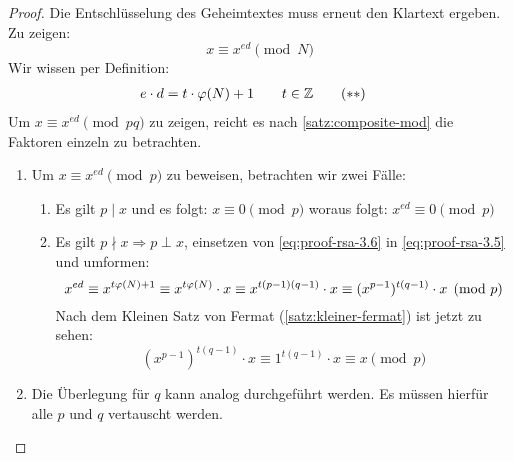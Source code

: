 \begin{proof}
  Die Entschlüsselung des Geheimtextes muss erneut den Klartext ergeben. Zu zeigen:
  \begin{equation}
    \label{eq:proof-rsa-3.5}
    x \equiv x^{ed} \pmod{N} \tag{$*$}
  \end{equation}
  Wir wissen per Definition:
  \begin{align}
    \label{eq:proof-rsa-3.6}
    e \cdot d & = t \cdot \varphi(N) + 1 \qquad t \in \mathbb{Z} \tag{$**$}
  \end{align}
  Um $x \equiv x^{ed} \pmod{pq}$ zu zeigen, reicht es nach \eqref{satz:composite-mod}
  die Faktoren einzeln zu betrachten.
  \begin{enumerate}
    \item Um $x \equiv x^{ed} \pmod{p}$ zu beweisen, betrachten wir zwei Fälle:
          \begin{enumerate}[topsep=0pt]
            \item Es gilt $p \mid x$ und es folgt:
                  $x \equiv 0 \pmod{p}$ woraus folgt: $x^{ed} \equiv 0 \pmod{p}$
            \item Es gilt $p \nmid x \Rightarrow p \perp x$, einsetzen von \eqref{eq:proof-rsa-3.6} in
                  \eqref{eq:proof-rsa-3.5}
                  und umformen:
                  \begin{equation*}
                    x^{ed} \equiv x^{t\varphi(N) + 1} \equiv
                    x^{t\varphi(N)} \cdot x \equiv
                    x^{t(p - 1)(q - 1)} \cdot x \equiv
                    (x^{p - 1})^{t(q - 1)} \cdot x \pmod{p}
                  \end{equation*}
                  Nach dem Kleinen Satz von Fermat (\ref{satz:kleiner-fermat}) ist jetzt zu sehen:
                  \begin{equation*}
                    (x^{p - 1})^{t(q - 1)} \cdot x \equiv
                    1^{t(q - 1)} \cdot x \equiv x \pmod{p}
                  \end{equation*}
          \end{enumerate}
    \item Die Überlegung für $q$ kann analog durchgeführt werden. Es müssen hierfür
          alle $p$ und $q$ vertauscht werden. \qedhere
  \end{enumerate}
\end{proof}

